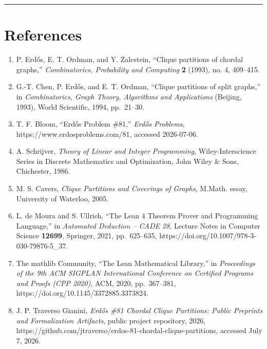 \documentclass[
  11pt,
]{article}
\begin{document}
\begin{center}\rule{0.5\linewidth}{0.5pt}\end{center}

\section{References}\label{references}

\begin{enumerate}
\def\labelenumi{\arabic{enumi}.}
\item
  P. Erdős, E. T. Ordman, and Y. Zalcstein, ``Clique partitions of
  chordal graphs,'' \emph{Combinatorics, Probability and Computing}
  \textbf{2} (1993), no. 4, 409--415.
\item
  G.-T. Chen, P. Erdős, and E. T. Ordman, ``Clique partitions of split
  graphs,'' in \emph{Combinatorics, Graph Theory, Algorithms and
  Applications} (Beijing, 1993), World Scientific, 1994, pp.~21--30.
\item
  T. F. Bloom, ``Erdős Problem \#81,'' \emph{Erdős Problems},
  https://www.erdosproblems.com/81, accessed 2026-07-06.
\item
  A. Schrijver, \emph{Theory of Linear and Integer Programming},
  Wiley-Interscience Series in Discrete Mathematics and Optimization,
  John Wiley \& Sons, Chichester, 1986.
\item
  M. S. Cavers, \emph{Clique Partitions and Coverings of Graphs},
  M.Math. essay, University of Waterloo, 2005.
\item
  L. de Moura and S. Ullrich, ``The Lean 4 Theorem Prover and
  Programming Language,'' in \emph{Automated Deduction -- CADE 28},
  Lecture Notes in Computer Science \textbf{12699}, Springer, 2021,
  pp.~625--635, https://doi.org/10.1007/978-3-030-79876-5\_37.
\item
  The mathlib Community, ``The Lean Mathematical Library,'' in
  \emph{Proceedings of the 9th ACM SIGPLAN International Conference on
  Certified Programs and Proofs (CPP 2020)}, ACM, 2020, pp.~367--381,
  https://doi.org/10.1145/3372885.3373824.
\item
  J. P. Traverso Gianini, \emph{Erdős \#81 Chordal Clique Partitions:
  Public Preprints and Formalization Artifacts}, public project
  repository, 2026,
  https://github.com/jtraverso/erdos-81-chordal-clique-partitions,
  accessed July 7, 2026.
\end{enumerate}
\end{document}
